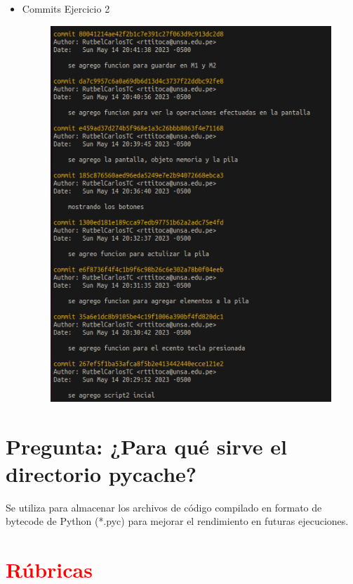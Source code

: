\documentclass{article}
\begin{document}
\begin{itemize}
	\item Commits Ejercicio 2    
	\begin{figure}[H]
	    \centering
	    \includegraphics[scale=0.5]{img/commits/commit-ejercicio2.png}
	\end{figure}    
\end{itemize}

\section{Pregunta: ¿Para qué sirve el directorio pycache?}
Se utiliza para almacenar los archivos de código compilado en formato de bytecode de Python (*.pyc) para mejorar el rendimiento en futuras ejecuciones.


\section{\textcolor{red}{Rúbricas}}
\end{document}
